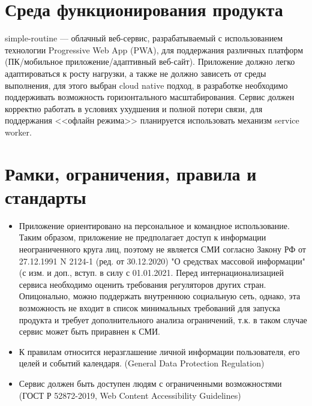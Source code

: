 \section{Среда функционирования продукта}
\label{sec:environment}

simple-routine --- облачный веб-сервис, разрабатываемый с использованием технологии Progressive Web App (PWA), для поддержания различных платформ (ПК/мобильное приложение/адаптивный веб-сайт). Приложение должно легко адаптироваться к росту нагрузки, а также не должно зависеть от среды выполнения, для этого выбран cloud native подход, в разработке необходимо поддерживать возможность горизонтального масштабирования. Сервис должен корректно работать в условиях ухудшения и полной потери связи, для поддержания <<офлайн режима>> планируется использовать механизм service worker.

\section{Рамки, ограничения, правила и стандарты}
\begin{itemize}
    \item Приложение ориентировано на персональное и командное использование. Таким образом, приложение не предполагает доступ к информации неограниченного круга лиц, поэтому не является СМИ согласно Закону РФ от 27.12.1991 N 2124-1 (ред. от 30.12.2020) "О средствах массовой информации" (с изм. и доп., вступ. в силу с 01.01.2021. Перед интернационализацией сервиса необходимо оценить требования регуляторов других стран. Опицонально, можно поддержать внутреннюю социальную сеть, однако, эта возможность не входит в список минимальных требований для запуска продукта и требует дополнительного анализа ограничений, т.к. в таком случае сервис может быть приравнен к СМИ.
    \item К правилам относится неразглашение личной информации пользователя, его целей и событий календаря. (General Data Protection Regulation) 
    \item Сервис должен быть доступен людям с ограниченными возможностями (ГОСТ Р 52872-2019, Web Content Accessibility Guidelines)
\end{itemize}
